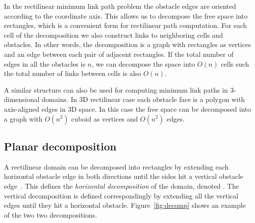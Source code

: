 \documentclass[english,gradu]{tktltiki2018}
\begin{document}
In the rectilinear minimum link path problem the obstacle edges are oriented according to the coordinate axis.
This allows us to decompose the free space into rectangles, which is a convenient form for rectilinear path computation.
For each cell of the decomposition we also construct links to neighboring cells and obstacles.
In other words, the decomposition is a graph with rectangles as vertices and an edge between each pair of adjacent rectangles.
If the total number of edges in all the obstacles is $n$, we can decompose the space into $O(n)$ cells such the total number of links between cells is also $O(n)$.

A similar structure can also be used for computing minimum link paths in 3-dimensional domains.
In 3D rectilinear case each obstacle face is a polygon with axis-aligned edges in 3D space.
In this case the free space can be decomposed into a graph with $O(n^2)$ cuboid as vertices and $O(n^2)$ edges.

\subsection{Planar decomposition}\label{sec:decomp2d}

A rectilinear domain can be decomposed into rectangles by extending each horizontal obstacle edge in both directions until the sides hit a vertical obstacle edge~\cite{dasnar}.
This defines the \emph{horizontal decomposition} of the domain, denoted .
The vertical decomposition  is defined correspondingly by extending all the vertical edges until they hit a horizontal obstacle.
Figure~\ref{fig:decomp} shows an example of the two two decompositions.
\end{document}
